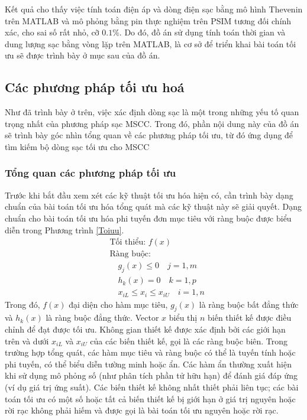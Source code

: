 \documentclass{thesis}
\begin{document}
Kết quả cho thấy việc tính toán điện áp và dòng điện sạc bằng mô hình Thevenin trên MATLAB và mô phỏng bằng pin thực nghiệm trên PSIM tương đối chính xác, cho sai số rất nhỏ, cỡ $0.1\%$. Do đó, đồ án sử dụng tính toán thời gian và dung lượng sạc bằng vòng lặp trên MATLAB, là cơ sở để triển khai bài toán tối ưu sẽ được trình bày ở mục sau của đồ án. 





\subsection{Các phương pháp tối ưu hoá}
Như đã trình bày ở trên, việc xác định dòng sạc là một trong những yếu tố quan trọng nhất của phương pháp sạc MSCC. Trong đó, phần nội dung này của đồ án sẽ trình bày góc nhìn tổng quan về các phương pháp tối ưu, từ đó ứng dụng để tìm kiếm bộ dòng sạc tối ưu cho MSCC

\subsubsection{Tổng quan các phương pháp tối ưu}


Trước khi bắt đầu xem xét các kỹ thuật tối ưu hóa hiện có, cần trình bày dạng chuẩn của bài toán tối ưu hóa tổng quát mà các kỹ thuật này sẽ giải quyết. Dạng chuẩn cho bài toán tối ưu hóa phi tuyến đơn mục tiêu với ràng buộc được biểu diễn trong Phương trình \ref{Toiuu}.
\begin{equation}
\begin{aligned}
&\text{Tối thiểu: } f(x) \\
&\text{Ràng buộc: } \\
&\quad g_j(x) \leq 0 \quad j = 1,m \\
&\quad h_k(x) = 0 \quad k = 1,p \\
&\quad x_{iL} \leq x_i \leq x_{iU} \quad i = 1,n
\end{aligned}
\label{Toiuu}
\end{equation}
Trong đó, $f(x)$ đại diện cho hàm mục tiêu, $g_j(x)$ là ràng buộc bất đẳng thức và $h_k(x)$ là ràng buộc đẳng thức. Vector $x$ biểu thị $n$ biến thiết kế được điều chỉnh để đạt được tối ưu. Không gian thiết kế được xác định bởi các giới hạn trên và dưới $x_{iL}$ và $x_{iU}$ của các biến thiết kế, gọi là các ràng buộc biên. Trong trường hợp tổng quát, các hàm mục tiêu và ràng buộc có thể là tuyến tính hoặc phi tuyến, có thể biểu diễn tường minh hoặc ẩn. Các hàm ẩn thường xuất hiện khi sử dụng mô phỏng số (như phân tích phần tử hữu hạn) để đánh giá đáp ứng (ví dụ giá trị ứng suất). Các biến thiết kế không nhất thiết phải liên tục; các bài toán tối ưu có một số hoặc tất cả biến thiết kế bị giới hạn ở giá trị nguyên hoặc rời rạc không phải hiếm và được gọi là bài toán tối ưu nguyên hoặc rời rạc.
\end{document}
